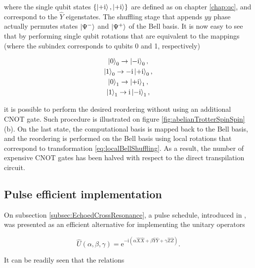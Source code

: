       \noindent where the single qubit states $\{\ket{+\mathrm{i}}, \ket{+\mathrm{i}}\}$ are defined as on chapter \ref{chap:qc}, and correspond to the $\hat{Y}$ eigenstates. The shuffling stage that appends $yy$ phase actually permutes states $\ket{\Psi^{-}}$ and $\ket{\Psi^{+}}$ of the Bell basis. It is now easy to see that by performing single qubit rotations that are equivalent to the mappings (where the subindex corresponds to qubits 0 and 1, respectively)

      \begin{gather}
        \ket{0}_0 \rightarrow \ket{-\mathrm{i}}_0, \\
        \ket{1}_0 \rightarrow -\mathrm{i}\ket{+\mathrm{i}}_0, \\
        \ket{0}_1 \rightarrow \ket{+\mathrm{i}}_1, \\
        \ket{1}_1 \rightarrow \mathrm{i}\ket{-\mathrm{i}}_1, \\
        \label{eq:localBellShuffling}
      \end{gather}

       \noindent it is possible to perform the desired reordering without using an additional CNOT gate. Such procedure is illustrated on figure \ref{fig:abelianTrotterSpinSpin}(b). On the last state, the computational basis is mapped back to the Bell basis, and the reordering is performed on the Bell basis using local rotations that correspond to transformation \ref{eq:localBellShuffling}. As a result, the number of expensive CNOT gates has been halved with respect to the direct transpilation circuit.

      

    \subsection{Pulse efficient implementation}
    \label{subsubsec:PulseEfficientCircuit}

      On subsection \ref{subsec:EchoedCrossResonance}, a pulse schedule, introduced in \cite{RXZPulseEfficient}, was presented as an efficient alternative for implementing the unitary operators

      \begin{equation}
        \hat{U}(\alpha, \beta, \gamma) = \mathrm{e}^{-\mathrm{i}(\alpha\hat{X}\hat{X} + \beta\hat{Y}\hat{Y} + \gamma\hat{Z}\hat{Z})}
        \label{eq:CartanDecomp2}.
      \end{equation}

      It can be readily seen that the relations

